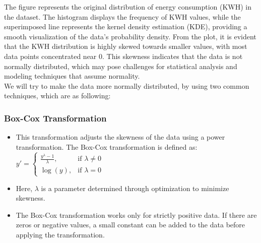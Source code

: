 \documentclass[english,12pt, titlepage]{article}
\begin{document}
	The figure represents the original distribution of energy consumption (KWH) in the dataset. The histogram displays the frequency of KWH values, while the superimposed line represents the kernel density estimation (KDE), providing a smooth visualization of the data's probability density. From the plot, it is evident that the KWH distribution is highly skewed towards smaller values, with most data points concentrated near 0. This skewness indicates that the data is not normally distributed, which may pose challenges for statistical analysis and modeling techniques that assume normality. \\
	
	We will try to make the data more normally distributed, by using two common techniques, which are as following:
	
	\subsubsection{Box-Cox Transformation}
	\begin{itemize}
		\item This transformation adjusts the skewness of the data using a power transformation. The Box-Cox transformation is defined as:\\
		
		\centering
		$
		y' =
		\begin{cases} 
			\frac{y^\lambda - 1}{\lambda}, & \text{if } \lambda \neq 0 \\
			\log(y), & \text{if } \lambda = 0
		\end{cases}
		$
		
		\item Here, $\lambda$ is a parameter determined through optimization to minimize skewness.
		\item The Box-Cox transformation works only for strictly positive data. If there are zeros or negative values, a small constant can be added to the data before applying the transformation.
	\end{itemize}
	
\end{document}
